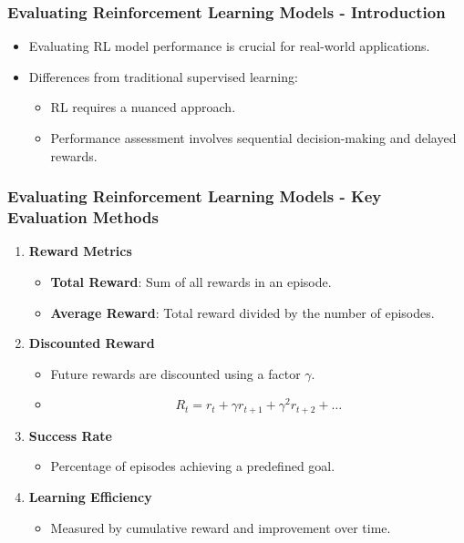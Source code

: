 \documentclass[aspectratio=169]{beamer}
\begin{document}
\begin{frame}[fragile]
    \frametitle{Evaluating Reinforcement Learning Models - Introduction}
    \begin{itemize}
        \item Evaluating RL model performance is crucial for real-world applications.
        \item Differences from traditional supervised learning:
        \begin{itemize}
            \item RL requires a nuanced approach.
            \item Performance assessment involves sequential decision-making and delayed rewards.
        \end{itemize}
    \end{itemize}
\end{frame}

\begin{frame}[fragile]
    \frametitle{Evaluating Reinforcement Learning Models - Key Evaluation Methods}
    \begin{enumerate}
        \item \textbf{Reward Metrics}
            \begin{itemize}
                \item \textbf{Total Reward}: Sum of all rewards in an episode.
                \item \textbf{Average Reward}: Total reward divided by the number of episodes.
            \end{itemize}
        \item \textbf{Discounted Reward}
            \begin{itemize}
                \item Future rewards are discounted using a factor $ \gamma $.
                \item \begin{equation}
                    R_t = r_t + \gamma r_{t+1} + \gamma^2 r_{t+2} + \ldots
                \end{equation}
            \end{itemize}
        \item \textbf{Success Rate}
            \begin{itemize}
                \item Percentage of episodes achieving a predefined goal.
            \end{itemize}
        \item \textbf{Learning Efficiency}
            \begin{itemize}
                \item Measured by cumulative reward and improvement over time.
            \end{itemize}
    \end{enumerate}
\end{frame}
\end{document}
